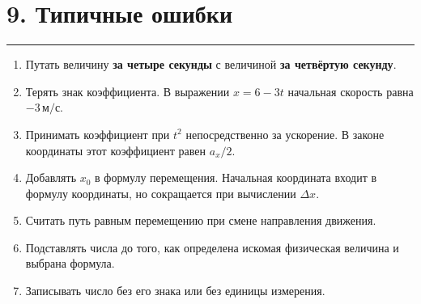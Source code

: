 \documentclass[a4paper,12pt]{article}
\newcommand{\sectionline}{%
  \vspace{0.1em}
  \noindent\textcolor{accent}{\rule{\linewidth}{0.5pt}}
  \vspace{0.45em}
}
\newcommand{\ms}{\,\text{м/с}}
\begin{document}
\section*{9. Типичные ошибки}
\sectionline

\begin{enumerate}
  \item Путать величину \textbf{за четыре секунды} с величиной \textbf{за четвёртую секунду}.

  \item Терять знак коэффициента. В выражении $x=6-3t$ начальная скорость равна $-3\ms$.

  \item Принимать коэффициент при $t^2$ непосредственно за ускорение. В законе координаты этот коэффициент равен $a_x/2$.

  \item Добавлять $x_0$ в формулу перемещения. Начальная координата входит в формулу координаты, но сокращается при вычислении $\Delta x$.

  \item Считать путь равным перемещению при смене направления движения.

  \item Подставлять числа до того, как определена искомая физическая величина и выбрана формула.

  \item Записывать число без его знака или без единицы измерения.
\end{enumerate}


\clearpage
\thispagestyle{empty}
\end{document}
